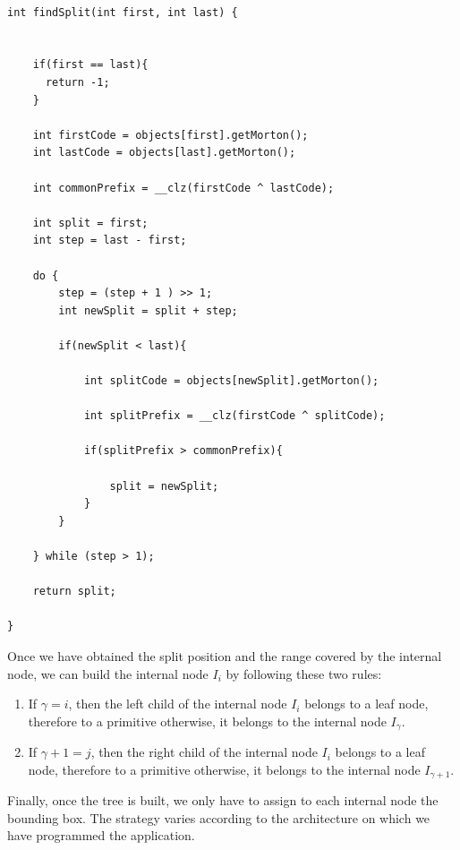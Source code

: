 \documentclass[titlepage,12pt]{report}
\begin{document}
\begin{lstlisting}

int findSplit(int first, int last) {
    
    
    if(first == last){
      return -1;
    }
    
    int firstCode = objects[first].getMorton();
    int lastCode = objects[last].getMorton();
    
    int commonPrefix = __clz(firstCode ^ lastCode);
    
    int split = first;
    int step = last - first;
    
    do {
        step = (step + 1 ) >> 1;
        int newSplit = split + step; 
        
        if(newSplit < last){
      
            int splitCode = objects[newSplit].getMorton();
            
            int splitPrefix = __clz(firstCode ^ splitCode);
      
            if(splitPrefix > commonPrefix){
                
                split = newSplit;
            }
        }
        
    } while (step > 1);
    
    return split;
        
}
\end{lstlisting}

Once we have obtained the split position and the range covered by the internal node, we can build the internal node $I_i$ by following these two rules:

\begin{enumerate}

\item If $\gamma = i$, then the left child of the internal node $I_i$ belongs to a leaf node, therefore to a primitive otherwise, it belongs to the internal node $I_{\gamma}$.

\item If $\gamma + 1 = j$, then the right child of the internal node $I_i$ belongs to a leaf node, therefore to a primitive otherwise, it belongs to the internal node $I_{\gamma+1}$.

\end{enumerate}

Finally, once the tree is built, we only have to assign to each internal node the bounding box. The strategy varies according to the architecture on which we have programmed the application.
\end{document}
